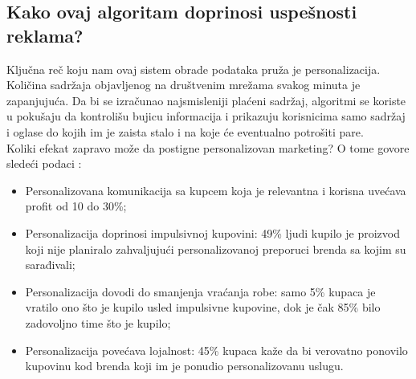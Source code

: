 \documentclass[a4paper]{article}
\begin{document}
	\subsection{Kako ovaj algoritam doprinosi uspešnosti reklama?}
	\label{subsec:uspesnostreklama}
	Ključna reč koju nam ovaj sistem obrade podataka pruža je personalizacija. Količina sadržaja objavljenog na društvenim mrežama svakog minuta je zapanjujuća. Da bi se izračunao najsmisleniji plaćeni sadržaj, algoritmi se koriste u pokušaju da kontrolišu bujicu 		informacija i prikazuju korisnicima samo sadržaj i oglase do kojih im je zaista stalo i na koje će eventualno potrošiti pare.\\
	Koliki efekat zapravo može da postigne personalizovan marketing?	O tome govore sledeći podaci \cite{statistikai}:\\
	\begin{itemize}
		\item Personalizovana komunikacija sa kupcem koja je relevantna i korisna uvećava profit od 10 do 30\%;
		\item Personalizacija doprinosi impulsivnoj kupovini: 49\% ljudi kupilo je proizvod koji nije planiralo zahvaljujući personalizovanoj preporuci brenda sa kojim su sarađivali;
		\item Personalizacija dovodi do smanjenja vraćanja robe: samo 5\% kupaca je vratilo ono što je kupilo usled impulsivne kupovine, dok je čak 85\% bilo zadovoljno time što je kupilo;
		\item Personalizacija povećava lojalnost: 45\% kupaca kaže da bi verovatno ponovilo kupovinu kod brenda koji im je ponudio personalizovanu uslugu.
	\end{itemize} \\
	
	
\end{document}
